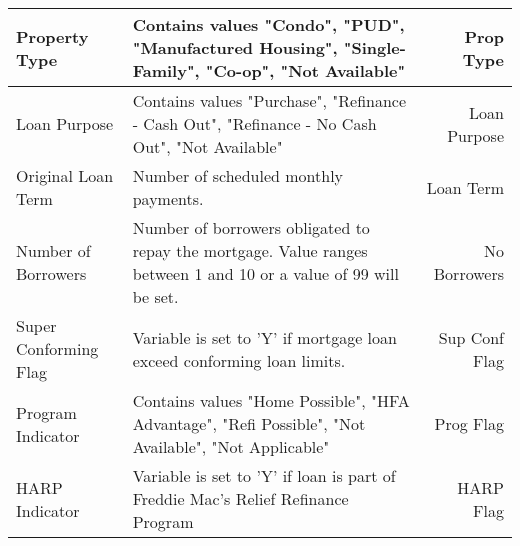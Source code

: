 \begin{longtable}{ Lp{8cm}R }
Property Type                             & Contains values "Condo", "PUD", "Manufactured Housing", "Single-Family",  "Co-op", "Not Available"                                                                                                                                                                                   & Prop Type          \\\hline
Loan Purpose                              & Contains values "Purchase", "Refinance - Cash Out", "Refinance - No Cash Out", "Not Available"                                                                                                                                                                                       & Loan Purpose       \\\hline
Original Loan Term                        & Number of scheduled monthly payments.                                                                                                                                                                                                                                                & Loan Term          \\\hline
Number of Borrowers                       & Number of borrowers obligated to repay the mortgage. Value ranges between 1 and 10 or a value of 99 will be set.                                                                                                                                                                     & No Borrowers       \\\hline
Super Conforming Flag                     & Variable is set to 'Y' if mortgage loan exceed conforming loan limits.                                                                                                                                                                                                               & Sup Conf Flag      \\\hline
Program Indicator                         & Contains values "Home Possible", "HFA Advantage", "Refi Possible", "Not Available", "Not Applicable"                                                                                                                                                                                 & Prog Flag          \\\hline
HARP Indicator                            & Variable is set to 'Y' if loan is part of Freddie Mac’s Relief Refinance Program                                                                                                                                                                                                     & HARP Flag          \\\hline

\end{longtable}
